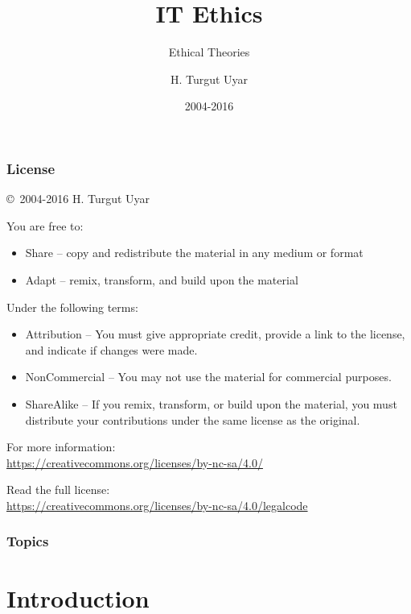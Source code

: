 \documentclass[dvipsnames]{beamer}
\title{IT Ethics}
\subtitle{Ethical Theories}
\author{H. Turgut Uyar}
\date{2004-2016}
\theoremstyle{plain}
\begin{document}
\begin{frame}
  \titlepage
\end{frame}

\begin{frame}
  \frametitle{License}

  \hfill
  \copyright~2004-2016 H. Turgut Uyar

  \vfill
  \begin{footnotesize}
    You are free to:
    \begin{itemize}
      \itemsep0em
      \item Share -- copy and redistribute the material in any medium or format
      \item Adapt -- remix, transform, and build upon the material
    \end{itemize}

    Under the following terms:
    \begin{itemize}
      \itemsep0em
      \item Attribution -- You must give appropriate credit, provide a link to
        the license, and indicate if changes were made.

      \item NonCommercial -- You may not use the material for commercial
        purposes.

      \item ShareAlike -- If you remix, transform, or build upon the material,
        you must distribute your contributions under the same license as the
        original.
    \end{itemize}
  \end{footnotesize}

  \begin{small}
    For more information:\\
    \url{https://creativecommons.org/licenses/by-nc-sa/4.0/}

    \smallskip
    Read the full license:\\
    \url{https://creativecommons.org/licenses/by-nc-sa/4.0/legalcode}
  \end{small}
\end{frame}

\begin{frame}
  \frametitle{Topics}
  \tableofcontents
\end{frame}

\section{Introduction}
\end{document}
